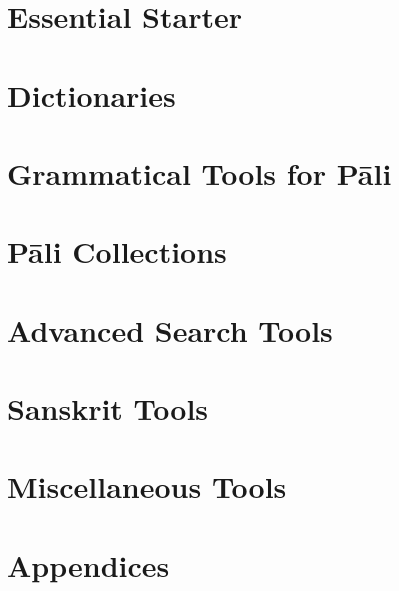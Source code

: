 


\cleardoublepage
{}
{}
\tableofcontents
\clearpage
{}
{}
\listoftables
\clearpage
{}
{}
\listoffigures

\mainmatter
\part{Essential Starter}
\cleardoublepage


\part{Dictionaries}


\part{Grammatical Tools for Pāli}








\part{Pāli Collections}




\part{Advanced Search Tools}


\part{Sanskrit Tools}






\part{Miscellaneous Tools}






\part{Appendices}
\appendix



\backmatter
\cleardoublepage



